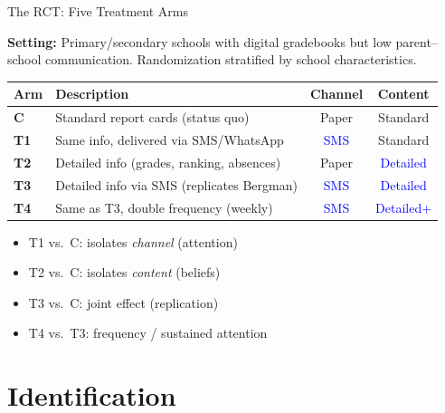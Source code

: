 \documentclass[aspectratio=169,11pt]{beamer}
\begin{document}
\begin{frame}{The RCT: Five Treatment Arms}

\textbf{Setting:} Primary/secondary schools with digital gradebooks but low parent--school communication. Randomization stratified by school characteristics.

\bigskip

\begin{table}[h]
\centering
\small
\begin{tabular}{@{}llcc@{}}
\toprule
\textbf{Arm} & \textbf{Description} & \textbf{Channel} & \textbf{Content} \\
\midrule
\textbf{C}  & Standard report cards (status quo) & Paper & Standard \\
\textbf{T1} & Same info, delivered via SMS/WhatsApp & \textcolor{blue}{SMS} & Standard \\
\textbf{T2} & Detailed info (grades, ranking, absences) & Paper & \textcolor{blue}{Detailed} \\
\textbf{T3} & Detailed info via SMS (replicates Bergman) & \textcolor{blue}{SMS} & \textcolor{blue}{Detailed} \\
\textbf{T4} & Same as T3, double frequency (weekly) & \textcolor{blue}{SMS} & \textcolor{blue}{Detailed+} \\
\bottomrule
\end{tabular}
\end{table}

\bigskip

\begin{itemize}
    \item T1 vs.\ C: isolates \emph{channel} (attention)
    \item T2 vs.\ C: isolates \emph{content} (beliefs)
    \item T3 vs.\ C: joint effect (replication)
    \item T4 vs.\ T3: frequency / sustained attention
\end{itemize}

\end{frame}

\section{Identification}
\end{document}
